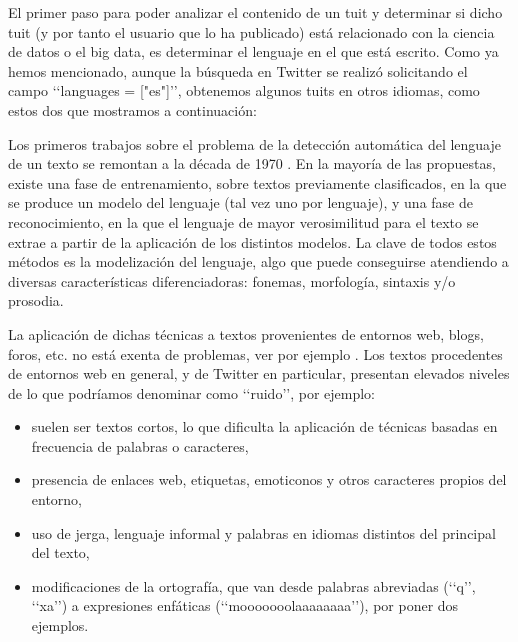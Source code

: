 El primer paso para poder analizar el contenido de un tuit y determinar si dicho tuit 
(y por tanto el usuario que lo ha publicado) está relacionado con la ciencia de datos o el big data,
es determinar el lenguaje en el que está escrito. Como ya hemos mencionado,
aunque la búsqueda en Twitter se realizó solicitando el campo \lq\lq languages = ["es"]\rq\rq,
obtenemos algunos tuits en otros idiomas, como estos dos 
que mostramos a continuación:


Los primeros trabajos sobre el problema de la detección automática del lenguaje de un texto
se remontan a la década de 1970 \cite{zissman-berkling}. En la mayoría de las propuestas, 
existe una fase de entrenamiento, sobre textos previamente clasificados, en la que se produce 
un modelo del lenguaje (tal vez uno por lenguaje), y una fase de reconocimiento, en la que 
el lenguaje de mayor verosimilitud para el texto se extrae a partir de la aplicación de los 
distintos modelos. La clave de todos estos métodos es la modelización del lenguaje, algo que puede 
conseguirse atendiendo a diversas características diferenciadoras: fonemas, morfología, 
sintaxis y/o prosodia. 

La aplicación de dichas técnicas a textos provenientes de entornos web, blogs,  foros, etc. 
no está exenta de problemas, ver por ejemplo \cite{almeida_estevez_piad}.
Los textos procedentes de entornos web en general, y de Twitter en particular, 
presentan elevados niveles de lo que podríamos denominar como \lq\lq ruido\rq\rq,
por ejemplo:
\begin{itemize}
\item suelen ser textos cortos, lo que dificulta la aplicación de técnicas basadas en frecuencia 
de palabras o caracteres,
\item presencia de enlaces web, etiquetas, emoticonos y otros caracteres propios del entorno,
\item uso de jerga, lenguaje informal y palabras en idiomas distintos del principal del texto,
\item modificaciones de la ortografía, que van desde palabras abreviadas (\lq\lq q\rq\rq, 
\lq\lq xa\rq\rq) a expresiones enfáticas (\lq\lq mooooooolaaaaaaaa\rq\rq), por poner dos 
ejemplos.
\end{itemize}


